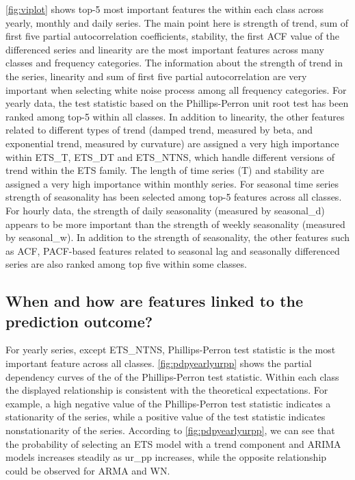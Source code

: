 \documentclass[11pt,a4paper,]{article}
\begin{document}
\autoref{fig:viplot} shows top-5 most important features the within each class across yearly, monthly and daily series. The main point here is strength of trend, sum of first five partial autocorrelation coefficients, stability, the first ACF value of the differenced series and linearity are the most important features across many classes and frequency categories. The information about the strength of trend in the series, linearity and sum of first five partial autocorrelation are very important when selecting white noise process among all frequency categories. For yearly data, the test statistic based on the Phillips-Perron unit root test has been ranked among top-5 within all classes. In addition to linearity, the other features related to different types of trend (damped trend, measured by beta, and exponential trend, measured by curvature) are assigned a very high importance within ETS\_T, ETS\_DT and ETS\_NTNS, which handle different versions of trend within the ETS family. The length of time series (T) and stability are assigned a very high importance within monthly series. For seasonal time series strength of seasonality has been selected among top-5 features across all classes. For hourly data, the strength of daily seasonality (measured by seasonal\_d) appears to be more important than the strength of weekly seasonality (measured by seasonal\_w). In addition to the strength of seasonality, the other features such as ACF, PACF-based features related to seasonal lag and seasonally differenced series are also ranked among top five within some classes.

\hypertarget{when-and-how-are-features-linked-to-the-prediction-outcome}{%
\subsection{When and how are features linked to the prediction outcome?}\label{when-and-how-are-features-linked-to-the-prediction-outcome}}

For yearly series, except ETS\_NTNS, Phillips-Perron test statistic is the most important feature across all classes. \autoref{fig:pdpyearlyurpp} shows the partial dependency curves of the of the Phillips-Perron test statistic.
Within each class the displayed relationship is consistent with the theoretical expectations. For example, a high negative value of the Phillips-Perron test statistic indicates a stationarity of the series, while a positive value of the test statistic indicates nonstationarity of the series. According to \autoref{fig:pdpyearlyurpp}, we can see that the probability of selecting an ETS model with a trend component and ARIMA models increases steadily as ur\_pp increases, while the opposite relationship could be observed for ARMA and WN.
\end{document}
